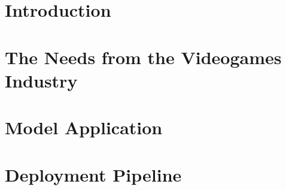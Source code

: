 \section{Introduction}
\label{industry_needs}
\lorem

\section{The Needs from the Videogames Industry}
\label{industry_needs}
\lorem

\section{Model Application}
\label{industry_needs}
\lorem

\section{Deployment Pipeline}
\label{industry_needs}
\lorem